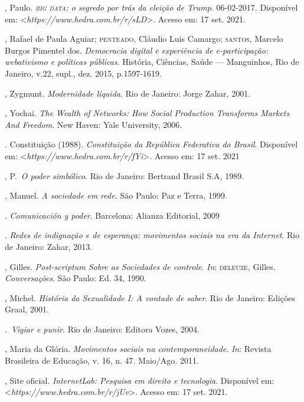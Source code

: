 \begin{bibliohedra}
, Paulo. \emph{\textsc{big data}: o segredo por trás da eleição de Trump}.
06-02-2017. Disponível em: \textless{}\emph{https://www.hedra.com.br/r/sLD}\textgreater{}. Acesso em: 17 set. 2021.

, Rafael de Paula Aguiar; \textsc{penteado}, Cláudio Luis Camargo; \textsc{santos},
Marcelo Burgos Pimentel dos. \emph{Democracia digital e experiência de
e-participação: webativismo e políticas públicas}. História, Ciências,
Saúde --- Manguinhos, Rio de Janeiro, v.22, supl., dez. 2015,
p.1597-1619.

, Zygmunt. \emph{Modernidade líquida}. Rio de Janeiro: Jorge Zahar, 2001.

, Yochai. \emph{The Wealth of Networks: How Social Production
Transforms Markets And Freedom}. New Haven: Yale University, 2006.

. Constituição (1988). \emph{Constituição da República
Federativa do Brasil}. Disponível em: \textless{}\emph{https://www.hedra.com.br/r/fYi}\textgreater{}. Acesso em: 17 set. 2021

, P.~\emph{O poder simbólico}. Rio de Janeiro: Bertrand Brasil
S.A, 1989.

, Manuel. \emph{A sociedade em rede.} São Paulo: Paz e Terra,
1999.

\titidem. \emph{Comunicación y poder}. Barcelona: Alianza
Editorial, 2009

\titidem. \emph{Redes de indignação e de esperança:
movimentos sociais na era da Internet}. Rio de Janeiro: Zahar, 2013.

, Gilles. \emph{Post-scriptum Sobre as Sociedades de controle}. \emph{In}: \textsc{deleuze}, Gilles. \emph{Conversações}. São Paulo: Ed. 34, 1990.

, Michel. \emph{História da Sexualidade I: A vontade de
saber}. Rio de Janeiro: Edições Graal, 2001.

\titidem.~\emph{Vigiar e punir}. Rio de Janeiro: Editora Vozes, 2004.

, Maria da Glória. \emph{Movimentos sociais na contemporaneidade}.
\emph{In}: Revista Brasileira de Educação, v. 16, n. 47. Maio/Ago. 2011.

, Site oficial. \emph{InternetLab: Pesquisa em direito e
tecnologia}. Disponível em: \textless{}\emph{https://www.hedra.com.br/r/jUv}\textgreater{}. Acesso em: 17 set. 2021.


\end{bibliohedra}
